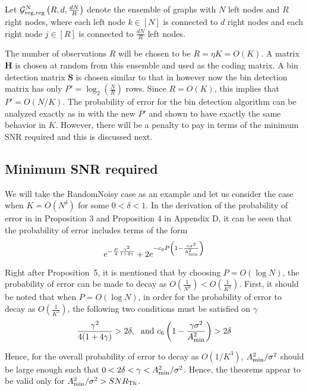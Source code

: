 \documentclass[journal,draft,onecolumn]{IEEEtran}
\begin{document}
\begin{definition}\label{def:leftandrighreg}
Let $\mathcal{G}^N_{\rm reg,reg}\left(R,d, \frac{dN}{R} \right)$ denote the ensemble of graphs with $N$ left nodes and $R$ right nodes, where each left node $k \in [N]$ is connected to $d$ right nodes and each right node $j \in [R]$ is connected to $\frac{dN}{R}$ left nodes.
\end{definition}

The number of observations $R$ will be chosen to be $R = \eta K = O(K)$. A matrix $\mathbf{H}$ is chosen at random from this ensemble and used as the coding matrix. A bin detection matrix $\mathbf{S}$ is chosen similar to that in \cite{li2015subdraft} however now the bin detection matrix has only $P' = \log_2 \left(\frac{N}{R}\right)$ rows. Since $R = O(K)$, this implies that $P' = O(N/K)$. The probability of error for the bin detection algorithm can be analyzed exactly as in \cite{li2015subdraft} with the new $P'$ and shown to have exactly the same behavior in $K$. However, there will be a penalty to pay in terms of the minimum SNR required and this is discussed next.

\subsection{Minimum SNR required}
We will take the RandomNoisy case as an example and let us consider the case when $K = O(N^\delta)$ for some $0 < \delta < 1$.  In the derivation of the probability of error in \cite{li2015subdraft} in Proposition 3 and Proposition 4 in Appendix D, it can be seen that the probability of error includes terms of the form
\[
e^{-\frac{P}{4} \frac{\gamma^2}{1+4\gamma}} + 2 e^{-c_6 P \left(1-\frac{\gamma \sigma^2}{A^2_{\rm min}} \right)}
\]

Right after Proposition~5, it is mentioned that by choosing $P = O(\log N)$, the probability of error can be made to decay as $O\left(\frac{1}{N^3} \right) <  O\left(\frac{1}{K^3} \right)$. First, it should be noted that when $P = O(\log N)$, in order for the probability of error to decay as $O\left(\frac{1}{K^3} \right)$, the following two conditions must be satisfied on $\gamma$
\[
\frac{\gamma^2}{4(1+4\gamma)} > 2 \delta, \ \ {\rm and} \ c_6 \left(1 - \frac{\gamma \sigma^2}{A_{\rm min}^2} \right) > 2 \delta
\]

Hence, for the overall probability of error to decay as $O(1/K^3)$, $A_{\rm min}^2/\sigma^2$ should be large enough such that $0 < 2 \delta < \gamma < A_{\rm min}^2/\sigma^2$. Hence, the theorems appear to be valid only for $A_{\rm min}^2/\sigma^2 > SNR_{\rm Th}$.
\end{document}
